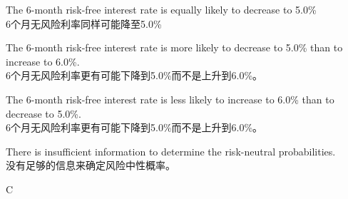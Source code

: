 \documentclass{article}
\begin{document}
\begin{choices}
    \item The 6-month risk-free interest rate is equally likely to decrease to 5.0\%\\
    6个月无风险利率同样可能降至5.0\%
    \item The 6-month risk-free interest rate is more likely to decrease to 5.0\% than to increase to
    6.0\%.\\
    6个月无风险利率更有可能下降到5.0\%而不是上升到6.0\%。
    \item The 6-month risk-free interest rate is less likely to increase to 6.0\% than to decrease to
    5.0\%.\\
    6个月无风险利率更有可能下降到5.0\%而不是上升到6.0\%。
    \item There is insufficient information to determine the risk-neutral probabilities.\\
    没有足够的信息来确定风险中性概率。
\end{choices}

\begin{correctanswer}
    C
\end{correctanswer}
\end{document}
